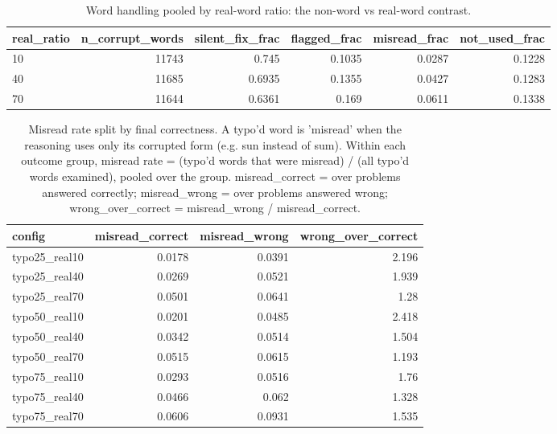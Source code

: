 \documentclass[11pt]{article}
\begin{document}
\begin{table}[H]
\centering
\caption{Word handling pooled by real-word ratio: the non-word vs real-word contrast.}
\small
\begin{adjustbox}{max width=\textwidth}
\begin{tabular}{lrrrrr}
\toprule
\textbf{real\_ratio} & \textbf{n\_corrupt\_words} & \textbf{silent\_fix\_frac} & \textbf{flagged\_frac} & \textbf{misread\_frac} & \textbf{not\_used\_frac} \\
\midrule
10 & 11743 & 0.745 & 0.1035 & 0.0287 & 0.1228 \\
40 & 11685 & 0.6935 & 0.1355 & 0.0427 & 0.1283 \\
70 & 11644 & 0.6361 & 0.169 & 0.0611 & 0.1338 \\
\bottomrule
\end{tabular}
\end{adjustbox}
\end{table}

\begin{table}[H]
\centering
\caption{Misread rate split by final correctness. A typo'd word is 'misread' when the reasoning uses only its corrupted form (e.g. sun instead of sum). Within each outcome group, misread rate = (typo'd words that were misread) / (all typo'd words examined), pooled over the group. misread\_correct = over problems answered correctly; misread\_wrong = over problems answered wrong; wrong\_over\_correct = misread\_wrong / misread\_correct.}
\small
\begin{adjustbox}{max width=\textwidth}
\begin{tabular}{lrrr}
\toprule
\textbf{config} & \textbf{misread\_correct} & \textbf{misread\_wrong} & \textbf{wrong\_over\_correct} \\
\midrule
typo25\_real10 & 0.0178 & 0.0391 & 2.196 \\
typo25\_real40 & 0.0269 & 0.0521 & 1.939 \\
typo25\_real70 & 0.0501 & 0.0641 & 1.28 \\
typo50\_real10 & 0.0201 & 0.0485 & 2.418 \\
typo50\_real40 & 0.0342 & 0.0514 & 1.504 \\
typo50\_real70 & 0.0515 & 0.0615 & 1.193 \\
typo75\_real10 & 0.0293 & 0.0516 & 1.76 \\
typo75\_real40 & 0.0466 & 0.062 & 1.328 \\
typo75\_real70 & 0.0606 & 0.0931 & 1.535 \\
\bottomrule
\end{tabular}
\end{adjustbox}
\end{table}
\end{document}
